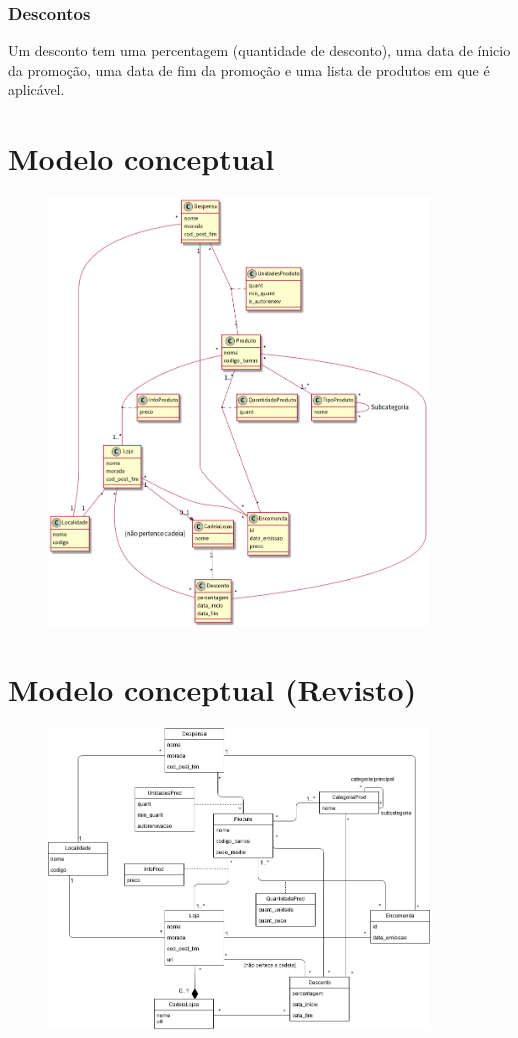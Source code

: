 \documentclass{report}
\begin{document}
\subsection{Descontos}
Um desconto tem uma percentagem (quantidade de desconto), uma data de ínicio
da promoção, uma data de fim da promoção e uma lista de produtos em que é
aplicável.

\chapter{Modelo conceptual}
\begin{figure}[H]
	\centering
	\includegraphics[width=0.9\textwidth]{../uml_model/modelo_concpt.png}
\end{figure}

\chapter{Modelo conceptual (Revisto)}
\begin{figure}[H]
	\centering
	\includegraphics[width=0.9\textwidth]{../uml_model/modelo_concpt_revised.png}
\end{figure}
\end{document}
